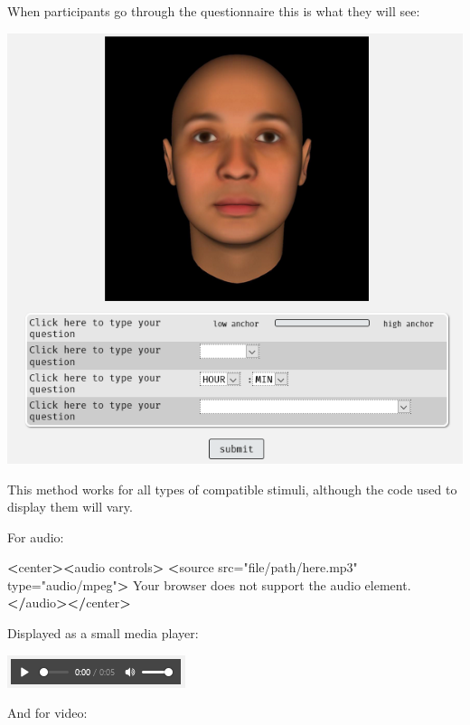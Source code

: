 \documentclass[]{book}
\newenvironment{Shaded}{\begin{snugshade}}{\end{snugshade}}
\newcommand{\StringTok}[1]{\textcolor[rgb]{0.31,0.60,0.02}{#1}}
\newcommand{\OperatorTok}[1]{\textcolor[rgb]{0.81,0.36,0.00}{\textbf{#1}}}
\newcommand{\ErrorTok}[1]{\textcolor[rgb]{0.64,0.00,0.00}{\textbf{#1}}}
\newcommand{\NormalTok}[1]{#1}
\begin{document}
When participants go through the questionnaire this is what they will
see:

\includegraphics{images/screenshots/quest_stim_3.png}

This method works for all types of compatible stimuli, although the code
used to display them will vary.

For audio:

\begin{Shaded}
\begin{Highlighting}[]
\OperatorTok{<}\NormalTok{center}\OperatorTok{>}\ErrorTok{<}\NormalTok{audio controls}\OperatorTok{>}
\StringTok{  }\ErrorTok{<}\NormalTok{source src=}\StringTok{"file/path/here.mp3"}\NormalTok{ type=}\StringTok{"audio/mpeg"}\OperatorTok{>}
\NormalTok{Your browser does not support the audio element.}
\OperatorTok{<}\ErrorTok{/}\NormalTok{audio}\OperatorTok{>}\ErrorTok{</}\NormalTok{center}\OperatorTok{>}\StringTok{ }
\end{Highlighting}
\end{Shaded}

Displayed as a small media player:

\includegraphics{images/screenshots/quest_stim_4.png}

And for video:
\end{document}
